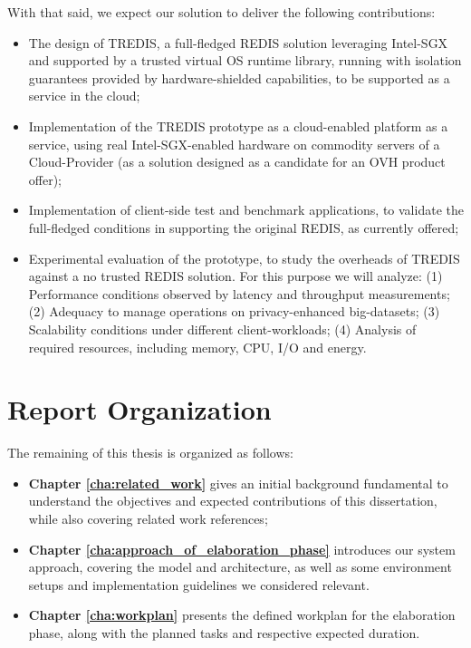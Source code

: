 With that said, we expect our solution to deliver the following contributions:
\begin{itemize}
	\item The design of TREDIS, a full-fledged REDIS solution leveraging Intel-SGX and supported by a trusted virtual OS runtime library, running with isolation guarantees provided by hardware-shielded capabilities, to be supported as a service in the cloud;
	\item Implementation of the TREDIS prototype as a cloud-enabled platform as a service, using real Intel-SGX-enabled hardware on commodity servers of a Cloud-Provider (as a solution designed as a candidate for an OVH product offer);
	\item Implementation of client-side test and benchmark applications, to validate the full-fledged conditions in supporting the original REDIS, as currently offered;
	\item Experimental evaluation of the prototype, to study the overheads of TREDIS against a no trusted REDIS solution. For this purpose we will analyze: (1) Performance conditions observed by latency and throughput measurements; (2) Adequacy to manage operations on privacy-enhanced big-datasets; (3) Scalability conditions under different client-workloads; (4) Analysis of required resources, including memory, CPU, I/O and energy.
	
\end{itemize}




\section{Report Organization}

The remaining of this thesis is organized as follows:
\begin{itemize}
	\item \textbf{Chapter \ref{cha:related_work}} gives an initial background fundamental to understand the objectives and expected contributions of this dissertation, while also covering related work references; 
	\item \textbf{Chapter \ref{cha:approach_of_elaboration_phase}} introduces our system approach, covering the model and architecture, as well as some environment setups and implementation guidelines we considered relevant.
	\item \textbf{Chapter \ref{cha:workplan}} presents the defined workplan for the elaboration phase, along with the planned tasks and respective expected duration.
\end{itemize}
